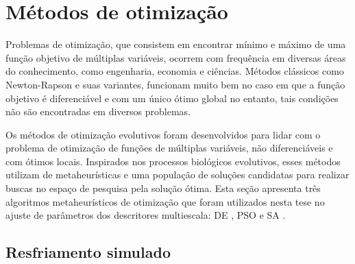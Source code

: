 \begin{comment}
\begin{equation}
D_f = 2 - \lim_{r \to 0}  \frac{\log{A(r)}}{\log{r}}.
\label{eq:df}
\end{equation}
Then, the derivative of th log-log curve for $N$ discrete values of radii $r_i>0$ gives 

\begin{equation}
MFD = \big(D_f(t_1)\text{, }D_f(t_2)\text{, }\ldots\text{ , }D_f(t_N)\big), 
\label{eq:dfm}
\end{equation}

\noindent where  $D_f(t) = 2 - \frac{du(t)}{dt}$, $t = \log{r}$ and $u(t) = \log{A(t)}$.

\end{comment}

\section{Métodos de otimização}

Problemas de otimização, que consistem em encontrar mínimo e máximo de uma função objetivo de múltiplas variáveis, ocorrem com frequência em diversas áreas do conhecimento, como engenharia, economia e ciências. Métodos clássicos como Newton-Rapson e suas variantes, funcionam muito bem no caso em que a função objetivo é diferenciável e com um único ótimo global no entanto, tais condições não são encontradas em diversos problemas. 

Os métodos de otimização evolutivos foram desenvolvidos para lidar com o problema de otimização de funções de múltiplas  variáveis, não diferenciáveis e com ótimos locais. Inspirados nos processos biológicos evolutivos, esses métodos utilizam de metaheurísticas e uma população de soluções candidatas para realizar buscas no espaço de pesquisa pela solução ótima. Esta seção apresenta três algoritmos metaheurísticos de otimização que foram utilizados nesta tese no ajuste de parâmetros dos descritores multiescala: \acl{DE} \cite{Storn:1007}, \acl{PSO}  \cite{Yuhui:1998} e \acl{SA} \cite{Andries:2007}.
\subsection{Resfriamento simulado}

